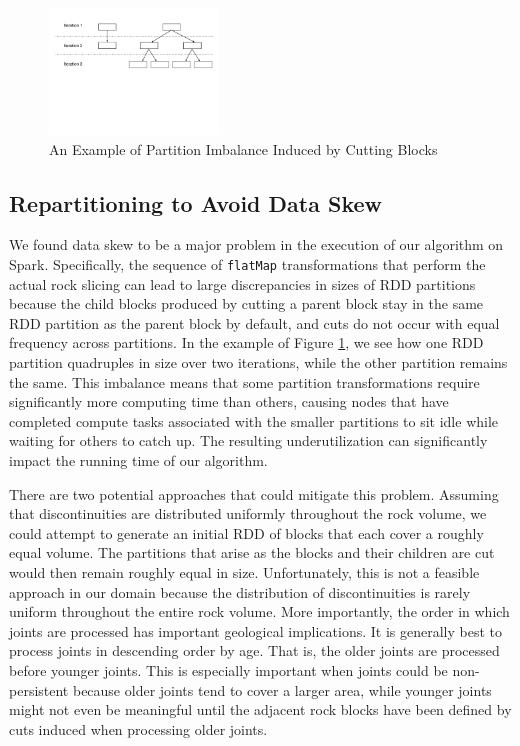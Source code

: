 \begin{figure}[h]
\centering
\includegraphics[width=0.4\textwidth]{flatMap.pdf}
\caption{An Example of Partition Imbalance Induced by Cutting Blocks}
\label{fig:flatMap}
\end{figure}

\subsection{Repartitioning to Avoid Data Skew}
We found data skew to be a major problem in the execution of our algorithm on Spark. Specifically, the sequence of \texttt{flatMap} transformations that perform the actual rock slicing can lead to large discrepancies in sizes of RDD partitions because the child blocks produced by cutting a parent block stay in the same RDD partition as the parent block by default, and cuts do not occur with equal frequency across partitions. In the example of Figure \ref{fig:flatMap}, we see how one RDD partition quadruples in size over two iterations, while the other partition remains the same. This imbalance means that some partition transformations require significantly more computing time than others, causing nodes that have completed compute tasks associated with the smaller partitions to sit idle while waiting for others to catch up. The resulting underutilization can significantly impact the running time of our algorithm.

There are two potential approaches that could mitigate this problem. Assuming that discontinuities are distributed uniformly throughout the rock volume, we could attempt to generate an initial RDD of blocks that each cover a roughly equal volume. The partitions that arise as the blocks and their children are cut would then remain roughly equal in size. Unfortunately, this is not a feasible approach in our domain because the distribution of discontinuities is rarely uniform throughout the entire rock volume. More importantly, the order in which joints are processed has important geological implications. It is generally best to process joints in descending order by age. That is, the older joints are processed before younger joints. This is especially important when joints could be non-persistent because older joints tend to cover a larger area, while younger joints might not even be meaningful until the adjacent rock blocks have been defined by cuts induced when processing older joints.

